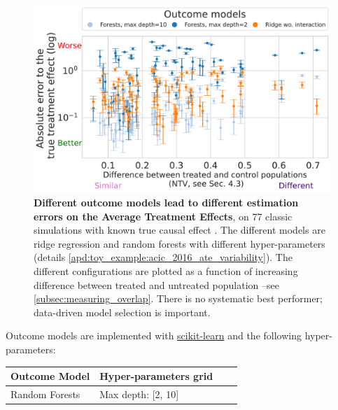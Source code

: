 \documentclass[11pt]{article}
\let\cite=\supercite
\begin{document}
\begin{appendices}
    \begin{figure}[!b]
        \centering
        \includegraphics[width=0.95\linewidth]{images/2023-03-08-11-10-28_acic_2016_ate_heterogeneity.parquet_abs_bias_ylog_scale=True.pdf}%
        \caption{\textbf{Different outcome models lead to different
                estimation errors on the Average Treatment Effects},
            on 77 classic simulations with known true causal effect
            \cite{dorie_automated_2019}. The different models are ridge regression
            and random forests with different hyper-parameters
            (details
            \ref{apd:toy_example:acic_2016_ate_variability}). The different configurations are
            plotted as a function of increasing difference between treated and
            untreated population --see
            \autoref{subsec:measuring_overlap}.
            There is no systematic best performer; data-driven model
            selection is important.
            \label{fig:acic_2016_ate_heterogeneity}%
        }
    \end{figure}

    Outcome models are implemented with
    \href{https://scikit-learn.org/stable/}{scikit-learn}
    \cite{pedregosa_scikitlearn_2011} and the following hyper-parameters:

    \begin{table}[h!]
        \centering
        \begin{tabular}{llll}
            \toprule
            Outcome Model                                  & Hyper-parameters grid
            \\
            \midrule
            Random Forests                                 & Max depth: [2,
            10]                                                                    \\


\end{tabular}
\end{table}
\end{appendices}
\end{document}
